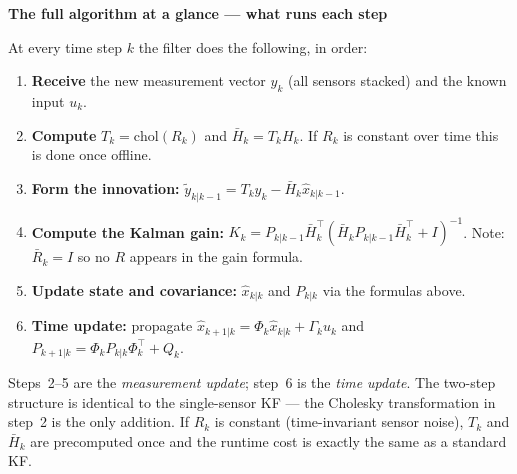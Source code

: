 \documentclass[12pt, a4paper]{article}
\begin{document}
\begin{notebox}
  \textbf{The full algorithm at a glance --- what runs each step}

  At every time step $k$ the filter does the following, in order:

  \begin{enumerate}[leftmargin=1.6em, itemsep=4pt]
    \item \textbf{Receive} the new measurement vector $y_k$ (all sensors
      stacked) and the known input $u_k$.

    \item \textbf{Compute} $T_k = \mathrm{chol}(R_k)$ and
      $\bar{H}_k = T_k H_k$.
      If $R_k$ is constant over time this is done once offline.

    \item \textbf{Form the innovation:}
      $\tilde{y}_{k|k-1} = T_k y_k - \bar{H}_k \hat{x}_{k|k-1}$.

    \item \textbf{Compute the Kalman gain:}
      $K_k = P_{k|k-1} \bar{H}_k^\top
      (\bar{H}_k P_{k|k-1} \bar{H}_k^\top + I)^{-1}$.
      Note: $\bar{R}_k = I$ so no $R$ appears in the gain formula.

    \item \textbf{Update state and covariance:}
      $\hat{x}_{k|k}$ and $P_{k|k}$ via the formulas above.

    \item \textbf{Time update:} propagate
      $\hat{x}_{k+1|k} = \Phi_k \hat{x}_{k|k} + \Gamma_k u_k$
      and
      $P_{k+1|k} = \Phi_k P_{k|k} \Phi_k^\top + Q_k$.
  \end{enumerate}

  Steps~2--5 are the \emph{measurement update}; step~6 is the
  \emph{time update}.
  The two-step structure is identical to the single-sensor KF ---
  the Cholesky transformation in step~2 is the only addition.
  If $R_k$ is constant (time-invariant sensor noise), $T_k$ and
  $\bar{H}_k$ are precomputed once and the runtime cost is exactly the
  same as a standard KF.
\end{notebox}
\end{document}
